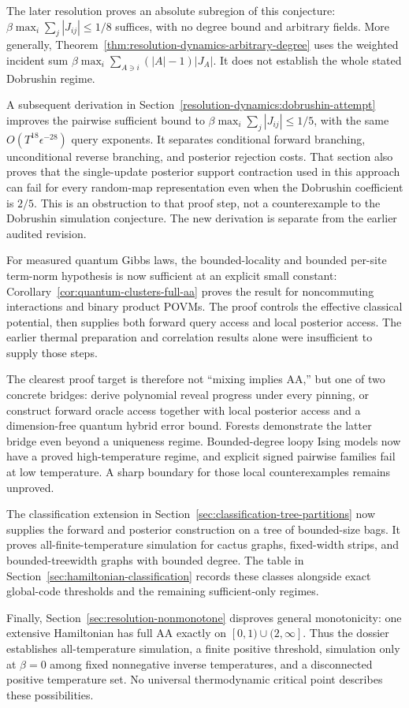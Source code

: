 The later resolution proves an absolute subregion of this conjecture:
$\beta\max_i\sum_j|J_{ij}|\le1/8$ suffices, with no degree bound
and arbitrary fields. More generally,
Theorem~\ref{thm:resolution-dynamics-arbitrary-degree} uses the
weighted incident sum $\beta\max_i\sum_{A\ni i}(|A|-1)|J_A|$.
It does not establish the whole stated Dobrushin regime.

A subsequent derivation in
Section~\ref{resolution-dynamics:dobrushin-attempt} improves the
pairwise sufficient bound to $\beta\max_i\sum_j|J_{ij}|\le1/5$,
with the same $O(T^{18}\epsilon^{-28})$ query exponents. It separates
conditional forward branching, unconditional reverse branching, and
posterior rejection costs. That section also proves that the
single-update posterior support contraction used in this approach
can fail for every random-map representation even when the
Dobrushin coefficient is $2/5$. This is an obstruction to that proof
step, not a counterexample to the Dobrushin simulation conjecture.
The new derivation is separate from the earlier audited revision.

For measured quantum Gibbs laws, the bounded-locality and bounded
per-site term-norm hypothesis is now sufficient at an explicit small
constant: Corollary~\ref{cor:quantum-clusters-full-aa} proves the
result for noncommuting interactions and binary product POVMs. The
proof controls the effective classical potential, then supplies both
forward query access and local posterior access. The earlier thermal
preparation and correlation results alone were insufficient to supply
those steps.

The clearest proof target is therefore not ``mixing implies AA,'' but
one of two concrete bridges: derive polynomial reveal progress under
every pinning, or construct forward oracle access together with local
posterior access and a dimension-free quantum hybrid error bound.
Forests demonstrate the latter bridge even beyond a uniqueness regime.
Bounded-degree loopy Ising models now have a proved high-temperature
regime, and explicit signed pairwise families fail at low temperature.
A sharp boundary for those local counterexamples remains unproved.

The classification extension in
Section~\ref{sec:classification-tree-partitions} now supplies the
forward and posterior construction on a tree of bounded-size bags.
It proves all-finite-temperature simulation for cactus graphs,
fixed-width strips, and bounded-treewidth graphs with bounded degree.
The table in Section~\ref{sec:hamiltonian-classification} records
these classes alongside exact global-code thresholds and the
remaining sufficient-only regimes.

Finally, Section~\ref{sec:resolution-nonmonotone} disproves general
monotonicity: one extensive Hamiltonian has full AA exactly on
$[0,1)\cup(2,\infty]$. Thus the dossier establishes all-temperature
simulation, a finite positive threshold, simulation only at $\beta=0$
among fixed nonnegative inverse temperatures, and a disconnected
positive temperature set. No universal thermodynamic critical point
describes these possibilities.
